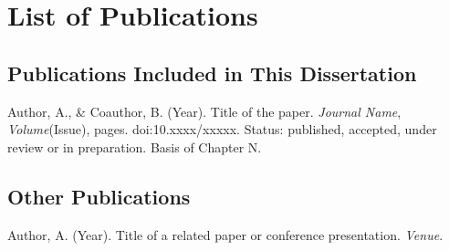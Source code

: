 \chapter*{List of Publications}
{}

\section*{Publications Included in This Dissertation}
\begin{enumerate}[label={[\arabic*]}, leftmargin=*]
  \item Author, A., \& Coauthor, B. (Year). Title of the paper. \emph{Journal Name}, \emph{Volume}(Issue), pages. doi:10.xxxx/xxxxx. Status: published, accepted, under review or in preparation. Basis of Chapter N. %
\end{enumerate}

\section*{Other Publications}
\begin{enumerate}[label={[\arabic*]}, leftmargin=*, resume]
  \item Author, A. (Year). Title of a related paper or conference presentation. \emph{Venue}. %
\end{enumerate}
